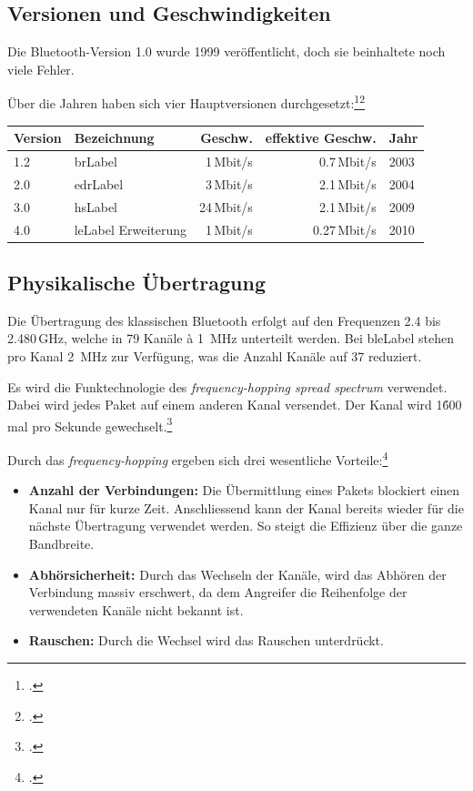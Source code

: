 \subsection{Versionen und Geschwindigkeiten}
\label{subsec:versions_speed}
Die Bluetooth-Version 1.0 wurde 1999 veröffentlicht, doch sie beinhaltete noch viele Fehler.

Über die Jahren haben sich vier Hauptversionen durchgesetzt:\footcite{Bluetooth_low_energy_Wikipedia_2015-04-17}\footcite{Our_History_Bluetooth_Technology_Website_2015-04-17}
\begin{table}[H]
\small\sffamily\renewcommand{\arraystretch}{1.4}
\begin{tabular}{llrrl}
\toprule
	Version & Bezeichnung & Geschw. & effektive Geschw.  & Jahr\\
\midrule
	1.2 & \gls{brLabel} & 1\,Mbit/s & 0.7\,Mbit/s & 2003 \\
	2.0 & \gls{edrLabel} & 3\,Mbit/s & 2.1\,Mbit/s & 2004 \\
	3.0 & \gls{hsLabel} & 24\,Mbit/s & 2.1\,Mbit/s & 2009\\
	4.0 & \gls{leLabel} Erweiterung & 1\,Mbit/s &  0.27\,Mbit/s & 2010 \\
\bottomrule
\end{tabular}
\end{table}



\subsection{Physikalische Übertragung}
Die Übertragung des klassischen Bluetooth erfolgt auf den Frequenzen 2.4 bis 2.480\,GHz, welche in 79 Kanäle à 1\, MHz unterteilt werden.
Bei \gls{bleLabel} stehen pro Kanal 2\, MHz zur Verfügung, was die Anzahl Kanäle auf 37 reduziert.

Es wird die Funktechnologie des \textit{frequency-hopping spread spectrum} verwendet.
Dabei wird jedes Paket auf einem anderen Kanal versendet.
Der Kanal wird 1\'600 mal pro Sekunde gewechselt.\footcite{Bluetooth_Wikipedia_2015-04-17}

Durch das \textit{frequency-hopping} ergeben sich drei wesentliche Vorteile:\footcite{Frequency-hopping_spread_spectrum_-_Wikipedia_2015-04-17}
\begin{itemize}
	\item \textbf{Anzahl der Verbindungen:} Die Übermittlung eines Pakets blockiert einen Kanal nur für kurze Zeit.
		Anschliessend kann der Kanal bereits wieder für die nächste Übertragung verwendet werden.
		So steigt die Effizienz über die ganze Bandbreite.
	\item \textbf{Abhörsicherheit:} Durch das Wechseln der Kanäle, wird das Abhören der Verbindung massiv erschwert, da dem Angreifer die Reihenfolge der verwendeten Kanäle nicht bekannt ist.
	\item \textbf{Rauschen:} Durch die Wechsel wird das Rauschen unterdrückt.
\end{itemize}


